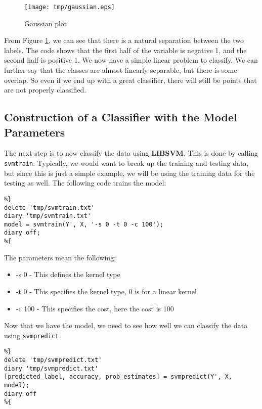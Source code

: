 \documentclass[11pt, twoside]{article}   	%
\begin{document}
\begin{figure}[h]
\centering
\texttt{[image: tmp/gaussian.eps]}
\caption{Gaussian plot}
\label{fig:gaus} 
\end{figure}

From Figure  \ref{fig:gaus}, we can see that there is a natural separation between the two labels. 
The code shows that the first half of the  variable is negative 1, and the second half is positive 1. 
We now have a simple linear problem to classify. We can further say that the classes are almost
linearly separable, but there is some overlap. So even if we end up with a great classifier, there
will still be points that are not properly classified. 


\subsection{Construction of a Classifier with the Model Parameters}
The next step is to now classify the data using \textbf{LIBSVM}. This is done by calling \texttt{svmtrain}.
 Typically, we would want to break up the training and testing data, but since 
this is just a simple example, we will be using the training data for the testing as well. The following code 
trains the model: 
\begin{lstlisting}
%}
delete 'tmp/svmtrain.txt'
diary 'tmp/svmtrain.txt'
model = svmtrain(Y', X, '-s 0 -t 0 -c 100');
diary off; 
%{
\end{lstlisting}

\color{lightgray}


\color{black}

The parameters mean the following: 
\begin{itemize}
\item -s 0 - This defines the kernel type
\item -t 0 - This specifies the kernel type, 0 is for a linear kernel
\item -c 100 - This specifies the cost, here the cost is 100
\end{itemize}

Now that we have the model, we need to see how well we can classify
the data using \texttt{svmpredict}. 
\begin{lstlisting}
%}
delete 'tmp/svmpredict.txt'
diary 'tmp/svmpredict.txt'
[predicted_label, accuracy, prob_estimates] = svmpredict(Y', X, model); 
diary off
%{
\end{lstlisting}
\end{document}
